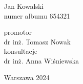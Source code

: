\documentclass[a4paper,12pt]{article}
\begin{document}
\vspace{1cm}

\begin{center}
{\helvetica\fontsize{14pt}{16pt}\selectfont
Jan Kowalski}\\[0.2cm]
{\helveticalight\fontsize{12pt}{14pt}\selectfont
numer albumu 654321}
\end{center}

\vspace{1.3cm}

\begin{center}
{\helveticalight\fontsize{12pt}{14pt}\selectfont
promotor\\
dr inż. Tomasz Nowak\\[0.6cm]
konsultacje\\
dr inż. Anna Wiśniewska}
\end{center}

\vfill

\begin{center}
{\helveticalight\fontsize{12pt}{14pt}\selectfont
Warszawa 2024}
\end{center}
\end{document}
